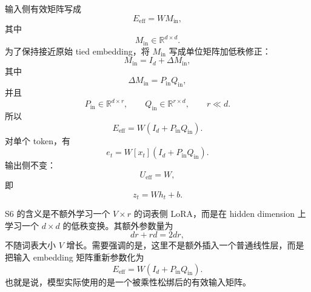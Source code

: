 输入侧有效矩阵写成
\begin{equation}
    E_{\mathrm{eff}} = W M_{\mathrm{in}},
\end{equation}
其中
\begin{equation}
    M_{\mathrm{in}} \in \mathbb{R}^{d \times d}.
\end{equation}
为了保持接近原始 tied embedding，将 $M_{\mathrm{in}}$ 写成单位矩阵加低秩修正：
\begin{equation}
    M_{\mathrm{in}} = I_d + \Delta M_{\mathrm{in}},
\end{equation}
其中
\begin{equation}
    \Delta M_{\mathrm{in}} = P_{\mathrm{in}}Q_{\mathrm{in}},
\end{equation}
并且
\begin{equation}
    P_{\mathrm{in}} \in \mathbb{R}^{d \times r}, \qquad
    Q_{\mathrm{in}} \in \mathbb{R}^{r \times d}, \qquad
    r \ll d.
\end{equation}
所以
\begin{equation}
    E_{\mathrm{eff}} =
    W(I_d + P_{\mathrm{in}}Q_{\mathrm{in}}).
\end{equation}
对单个 token，有
\begin{equation}
    e_t =
    W[x_t](I_d + P_{\mathrm{in}}Q_{\mathrm{in}}).
\end{equation}
输出侧不变：
\begin{equation}
    U_{\mathrm{eff}} = W,
\end{equation}
即
\begin{equation}
    z_t = W h_t + b.
\end{equation}

S6 的含义是不额外学习一个 $V \times r$ 的词表侧 LoRA，而是在 hidden dimension
上学习一个 $d \times d$ 的低秩变换。其额外参数量为
\begin{equation}
    dr + rd = 2dr,
\end{equation}
不随词表大小 $V$ 增长。需要强调的是，这里不是额外插入一个普通线性层，而是把输入
embedding 矩阵重新参数化为
\begin{equation}
    E_{\mathrm{eff}} =
    W(I_d + P_{\mathrm{in}}Q_{\mathrm{in}}).
\end{equation}
也就是说，模型实际使用的是一个被乘性松绑后的有效输入矩阵。


